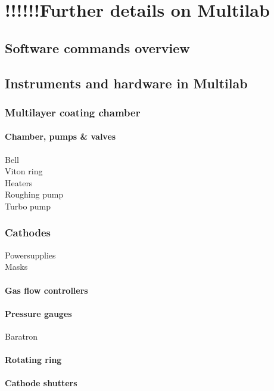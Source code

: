 \chapter{!!!!!!Further details on Multilab}\label{chap:multilab_details}

\section{Software commands overview}

\section{Instruments and hardware in Multilab}

\subsection{Multilayer coating chamber}\label{sec:ml_chamber}

\subsubsection{Chamber, pumps \& valves}
Bell\\
Viton ring\\
Heaters\\
Roughing pump\\
Turbo pump

\subsection{Cathodes}
Powersupplies\\
Masks\\

\subsubsection{Gas flow controllers}

\subsubsection{Pressure gauges}
Baratron\\

\subsubsection{Rotating ring}

\subsubsection{Cathode shutters}

